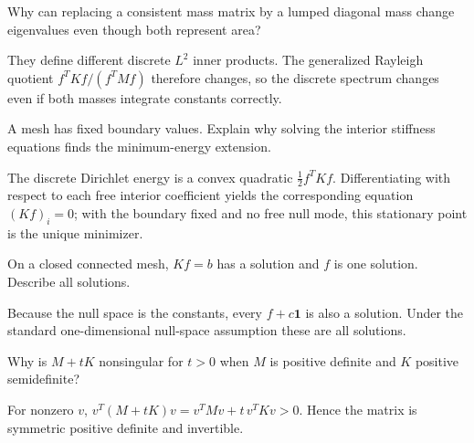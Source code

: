 \begin{problem}\label{prob:vii41-06}
Why can replacing a consistent mass matrix by a lumped diagonal mass change eigenvalues even though both represent area?
\end{problem}

\begin{solution}
They define different discrete \(L^2\) inner products.  The generalized Rayleigh quotient \(f^TKf/(f^TMf)\) therefore changes, so the discrete spectrum changes even if both masses integrate constants correctly.
\end{solution}

\begin{problem}\label{prob:vii41-07}
A mesh has fixed boundary values.  Explain why solving the interior stiffness equations finds the minimum-energy extension.
\end{problem}

\begin{solution}
The discrete Dirichlet energy is a convex quadratic \(\tfrac12 f^TKf\).  Differentiating with respect to each free interior coefficient yields the corresponding equation \((Kf)_i=0\); with the boundary fixed and no free null mode, this stationary point is the unique minimizer.
\end{solution}

\begin{problem}\label{prob:vii41-08}
On a closed connected mesh, \(Kf=b\) has a solution and \(f\) is one solution.  Describe all solutions.
\end{problem}

\begin{solution}
Because the null space is the constants, every \(f+c\mathbf1\) is also a solution.  Under the standard one-dimensional null-space assumption these are all solutions.
\end{solution}

\begin{problem}\label{prob:vii41-09}
Why is \(M+tK\) nonsingular for \(t>0\) when \(M\) is positive definite and \(K\) positive semidefinite?
\end{problem}

\begin{solution}
For nonzero \(v\), \(v^T(M+tK)v=v^TMv+t\,v^TKv>0\).  Hence the matrix is symmetric positive definite and invertible.
\end{solution}

